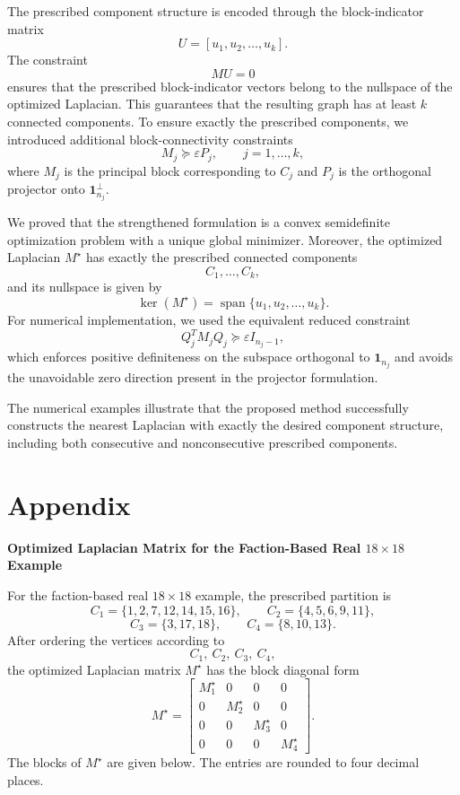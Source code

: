 \documentclass[11pt]{article}
\begin{document}
	The prescribed component structure is encoded through the block-indicator
	matrix
	\[
	U=[u_1,u_2,\ldots,u_k].
	\]
	The constraint
	\[
	MU=0
	\]
	ensures that the prescribed block-indicator vectors belong to the nullspace of
	the optimized Laplacian. This guarantees that the resulting graph has at least
	$k$ connected components. To ensure exactly the prescribed components, we
	introduced additional block-connectivity constraints
	\[
	M_j\succeq \varepsilon P_j,\qquad j=1,\ldots,k,
	\]
	where $M_j$ is the principal block corresponding to $C_j$ and $P_j$ is the
	orthogonal projector onto $\mathbf 1_{n_j}^{\perp}$.
	
	We proved that the strengthened formulation is a convex semidefinite
	optimization problem with a unique global minimizer. Moreover, the optimized
	Laplacian $M^\star$ has exactly the prescribed connected components
	\[
	C_1,\ldots,C_k,
	\]
	and its nullspace is given by
	\[
	\ker(M^\star)=\operatorname{span}\{u_1,u_2,\ldots,u_k\}.
	\]
	For numerical implementation, we used the equivalent reduced constraint
	\[
	Q_j^T M_j Q_j\succeq \varepsilon I_{n_j-1},
	\]
	which enforces positive definiteness on the subspace orthogonal to
	$\mathbf 1_{n_j}$ and avoids the unavoidable zero direction present in the
	projector formulation.
	
	The numerical examples illustrate that the proposed method successfully
	constructs the nearest Laplacian with exactly the desired component structure,
	including both consecutive and nonconsecutive prescribed components. 

\section*{Appendix}

\textbf{{Optimized Laplacian Matrix for the Faction-Based Real \texorpdfstring{$18\times18$}{18x18} Example}}
\label{app:real18_faction_matrix}

For the faction-based real $18\times18$ example, the prescribed partition is
\[
C_1=\{1,2,7,12,14,15,16\},
\qquad
C_2=\{4,5,6,9,11\},
\]
\[
C_3=\{3,17,18\},
\qquad
C_4=\{8,10,13\}.
\]
After ordering the vertices according to
\[
C_1,\ C_2,\ C_3,\ C_4,
\]
the optimized Laplacian matrix $M^\star$ has the block diagonal form
\[
M^\star=
\begin{bmatrix}
M^\star_1 & 0 & 0 & 0\\
0 & M^\star_2 & 0 & 0\\
0 & 0 & M^\star_3 & 0\\
0 & 0 & 0 & M^\star_4
\end{bmatrix}.
\]
The blocks of $M^\star$ are given below. The entries are rounded to four
decimal places.
\end{document}
